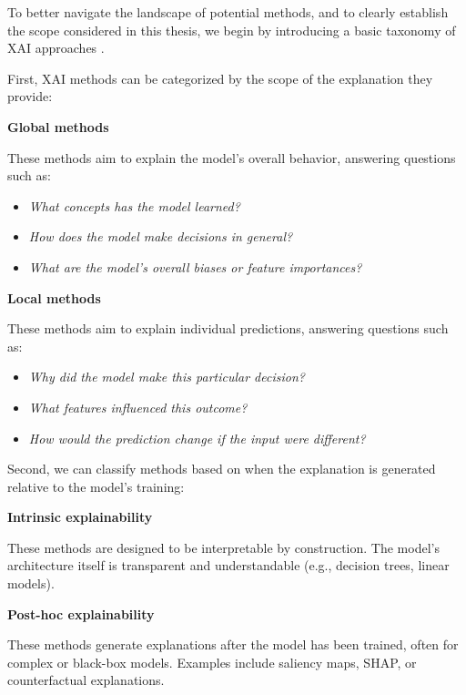 To better navigate the landscape of potential methods, and to clearly establish the scope considered in this thesis,
we begin by introducing a basic taxonomy of XAI approaches \cite{guidotti2018survey}.

First, XAI methods can be categorized by the scope of the explanation they provide:

\begin{multicols}{2}
    \centering \textbf{Global methods} \\[4pt]
    \raggedright
    These methods aim to explain the model's overall behavior, answering questions such as:
    \vspace{0.25cm}
    \begin{itemize}
        \item \textit{What concepts has the model learned?}
        \item \textit{How does the model make decisions in general?}
        \item \textit{What are the model's overall biases or feature importances?}
    \end{itemize}

    \columnbreak

    \centering \textbf{Local methods} \\[4pt]
    \raggedright
    These methods aim to explain individual predictions, answering questions such as:
    \vspace{0.25cm}
    \begin{itemize}
        \item \textit{Why did the model make this particular decision?}
        \item \textit{What features influenced this outcome?}
        \item \textit{How would the prediction change if the input were different?}
    \end{itemize}
\end{multicols}

Second, we can classify methods based on when the explanation is generated relative to the model's training:

\begin{multicols}{2}
    \centering \textbf{Intrinsic explainability} \\[4pt]
    \raggedright
    These methods are designed to be interpretable by construction.
    The model's architecture itself is transparent and understandable (e.g., decision trees, linear models).

    \columnbreak

    \centering \textbf{Post-hoc explainability} \\[4pt]
    \raggedright
    These methods generate explanations after the model has been trained, often for complex or black-box models.
    Examples include saliency maps, SHAP, or counterfactual explanations.
\end{multicols}

